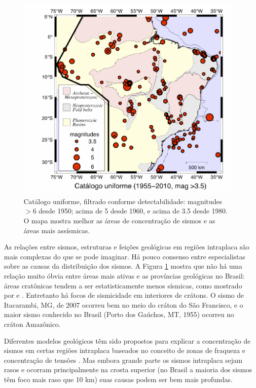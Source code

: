\documentclass[jgrga]{agutex}
\begin{document}
\begin{article}
\begin{figure}[H]
	\centerline{\includegraphics[width=1.17\hsize]{img_bsb_uniforme}}
	\caption{Catálogo uniforme, filtrado conforme detectabilidade: magnitudes $>$6 desde 1950; acima de 5 desde 1960, e acima de 3.5 desde 1980. O mapa mostra melhor as áreas de concentração de sismos e as áreas mais assísmicas.}
	\label{fig_bsb_uniforme}
\end{figure}

As relações entre sismos, estruturas e feições geológicas em regiões intraplaca são mais complexas do que se pode imaginar. Há pouco consenso entre especialistas sobre as causas da distribuição dos sismos.  A Figura \ref{fig_bsb_uniforme} mostra que não há uma relação muito óbvia entre áreas mais ativas e as províncias geológicas no Brasil: áreas cratônicas tendem a ser estatisticamente menos sísmicas, como mostrado por \citet{assumpcao_et_al_2014} e \citet{agurtodetzel_2015}. Entretanto há focos de sismicidade em interiores de crátons. O sismo de Itacarambi, MG, de 2007 ocorreu bem no meio do cráton do São Francisco, e o maior sismo conhecido no Brasil (Porto dos Gaúchos, MT, 1955) ocorreu no cráton Amazônico. 

Diferentes modelos geológicos têm sido propostos para explicar a concentração de sismos em certas regiões intraplaca baseados no conceito de zonas de fraqueza e concentração de tensões \citep{talwani_2014}. Mas embora grande parte os sismos intraplaca sejam rasos e ocorram principalmente na crosta superior (no Brasil a maioria dos sismos têm foco mais raso que 10 km) suas causas podem ser bem mais profundas. 


\end{article}
\end{document}
